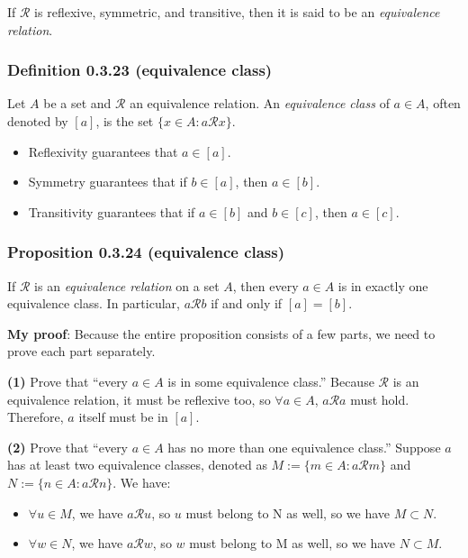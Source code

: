 \documentclass[12pt, letterpaper, oneside]{book}
\begin{document}
If $\mathcal{R}$ is reflexive, symmetric, and transitive, then it is said to be
an \textit{equivalence relation}.

\subsubsection{Definition 0.3.23 (equivalence class)}

Let $A$ be a set and $\mathcal{R}$ an equivalence relation. An
\textit{equivalence class} of $a \in A$, often denoted by $[a]$, is the set
$\{x \in A: a \mathcal{R} x\}$.

\begin{itemize}
  \item Reflexivity guarantees that $a \in [a]$.
  \item Symmetry guarantees that if $b \in [a]$, then $a \in [b]$.
  \item Transitivity guarantees that if $a \in [b]$ and $b \in [c]$, then $a
    \in [c]$.
\end{itemize}

\subsubsection{Proposition 0.3.24 (equivalence class)}

If $\mathcal{R}$ is an \textit{equivalence relation} on a set $A$, then every
$a \in A$ is in exactly one equivalence class. In particular, $a \mathcal{R} b$
if and only if $[a] = [b]$.

\colorbox{lime!100}{\textbf{My proof}}: Because the entire proposition consists
of a few parts, we need to prove each part separately.

\textbf{(1)} Prove that ``every $a \in A$ is in some equivalence class.''
Because $\mathcal{R}$ is an equivalence relation, it must be reflexive too, so
$\forall a \in A$, $a \mathcal{R} a$ must hold. Therefore, $a$ itself must be
in $[a]$.

\textbf{(2)} Prove that ``every $a \in A$ has no more than one equivalence
class.'' Suppose $a$ has at least two equivalence classes, denoted as $M := \{
m \in A: a \mathcal{R} m\}$ and $N := \{n \in A: a \mathcal{R} n\}$. We have:

\begin{itemize}
  \item $\forall u \in M$, we have $a \mathcal{R} u$, so $u$ must belong to N
    as well, so we have $M \subset N$.
  \item $\forall w \in N$, we have $a \mathcal{R} w$, so $w$ must belong to M
    as well, so we have $N \subset M$.
\end{itemize}
\end{document}
